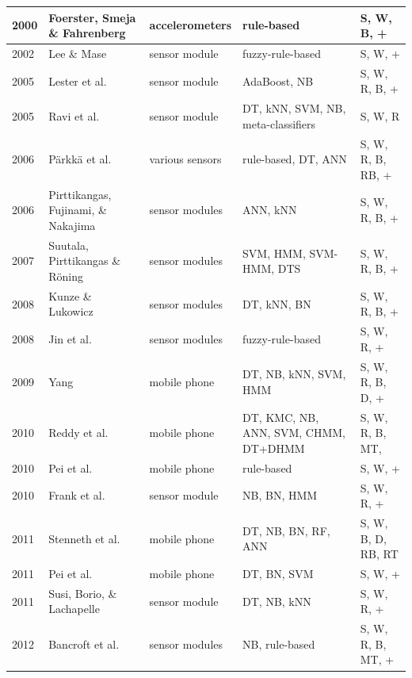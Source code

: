 \begin{center}
\begin{longtable} {|l|>{\raggedright}p{3cm}|p{2.4cm}|>{\centering\arraybackslash}p{2.5cm}|>{\centering\arraybackslash}p{2.2cm}|}
2000 & Foerster, Smeja \& Fahrenberg \cite{foerster2000motion} & accelerometers & rule-based & S, W, B, + \\ \hline
2002 & Lee \& Mase \cite{lee2002activity} & sensor module & fuzzy-rule-based & S, W, + \\ \hline
2005 & Lester et al. \cite{lester2005hybrid} & sensor module & AdaBoost, NB & S, W, R, B, + \\ \hline
2005 & Ravi et al. \cite{Ravi2005} & sensor module & DT, kNN, SVM, NB, meta-classifiers& S, W, R\\ \hline
2006 & P\"{a}rkk\"{a} et al. \cite{parkka2006activity} & various sensors & rule-based, DT, ANN & S, W, R, B, RB, + \\ \hline
2006 & Pirttikangas, Fujinami, \& Nakajima \cite{pirttikangas2006feature} & sensor modules & ANN, kNN & S, W, R, B, + \\ \hline
2007 & Suutala, Pirttikangas \& R\"{o}ning \cite{Suutula2007} & sensor modules & SVM, HMM, SVM-HMM, DTS & S, W, R, B, + \\ \hline
2008 & Kunze \& Lukowicz \cite{kunze2008dealing} & sensor modules & DT, kNN, BN & S, W, R, B, + \\ \hline
2008 & Jin et al. \cite{yin2008sensor} & sensor modules & fuzzy-rule-based & S, W, R, + \\ \hline
2009 & Yang \cite{yang2009toward} & mobile phone & DT, NB, kNN, SVM, HMM & S, W, R, B, D, + \\ \hline
2010 & Reddy et al. \cite{Reddy2010} & mobile phone & DT, KMC, NB, ANN, SVM, CHMM, DT+DHMM & S, W, R, B, MT,  \\ \hline 
2010 & Pei et al. \cite{Pei2010} & mobile phone & rule-based &  S, W, + \\ \hline
2010 & Frank et al. \cite{Frank2010}& sensor module & NB, BN, HMM & S, W, R, + \\ \hline
2011 & Stenneth et al. \cite{Stenneth2011}& mobile phone  & DT, NB, BN, RF, ANN & S, W, B, D, RB, RT \\ \hline
2011 & Pei et al. \cite{pei2011using} & mobile phone & DT, BN, SVM & S, W, + \\ \hline
2011 & Susi, Borio, \& Lachapelle \cite{susi2011accelerometer} & sensor module & DT, NB, kNN & S, W, R, +\\ \hline
2012 & Bancroft et al. \cite{Bancroft2012}& sensor modules & NB, rule-based & S, W, R, B, MT, +\\ \hline

\end{longtable}
\end{center}
